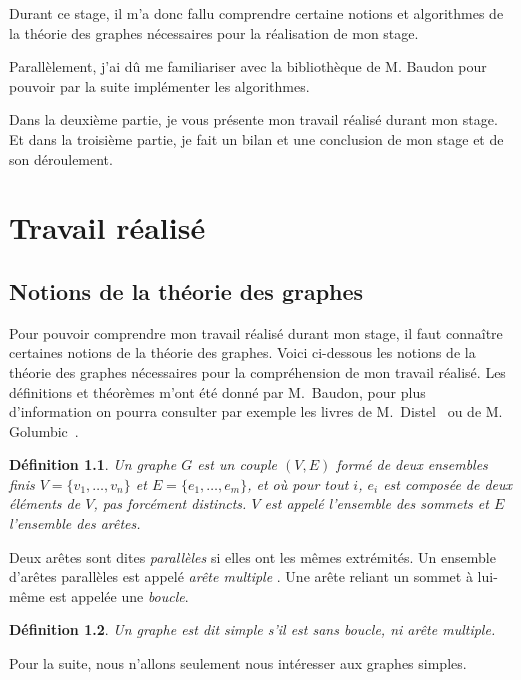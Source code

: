 \documentclass[12pt, a4paper]{report}
\newtheorem{definition}{Définition}
\begin{document}
	Durant ce stage, il m'a donc fallu comprendre certaine notions et algorithmes de la théorie des graphes nécessaires pour la réalisation de mon stage.
	
	Parallèlement, j'ai dû me familiariser avec la bibliothèque de M. Baudon pour pouvoir par la suite implémenter les algorithmes.
	
	Dans la deuxième partie, je vous présente mon travail réalisé durant mon stage. Et dans la troisième partie, je fait un bilan et une conclusion de mon stage et de son déroulement.
	
\chapter{Travail réalisé}

\section{Notions de la théorie des graphes}

	Pour pouvoir comprendre mon travail réalisé durant mon stage, il faut connaître certaines notions de la théorie des graphes. Voici ci-dessous les notions de la théorie des graphes nécessaires pour la compréhension de mon travail réalisé. Les définitions et théorèmes m'ont été donné par M.~Baudon, pour plus d'information on pourra consulter par exemple les livres de M.~Distel~\cite{D05} ou de M. Golumbic~\cite{G04}.
\begin{definition}
Un {\em graphe} $G$ est un couple $(V, E)$ formé de deux ensembles finis $V = \{v_1, \ldots, v_n\}$ et $E = \{e_1, \ldots, e_m\}$, et où pour tout $i$, $e_i$ est composée de deux éléments de $V$, pas forcément distincts. $V$ est appelé l'ensemble des 
{\em sommets} et $E$ l'ensemble des {\em arêtes}.
\end{definition}

Deux arêtes sont dites {\em parallèles} si elles ont les mêmes extrémités. Un ensemble d'arêtes parallèles est appelé {\em arête multiple} .
Une arête reliant un sommet à lui-même est appelée une {\em boucle}. 

\begin{definition}
Un graphe est dit simple s'il est sans boucle, ni arête multiple.
\end{definition}

	Pour la suite, nous n'allons seulement nous intéresser aux graphes simples.
	
\end{document}
